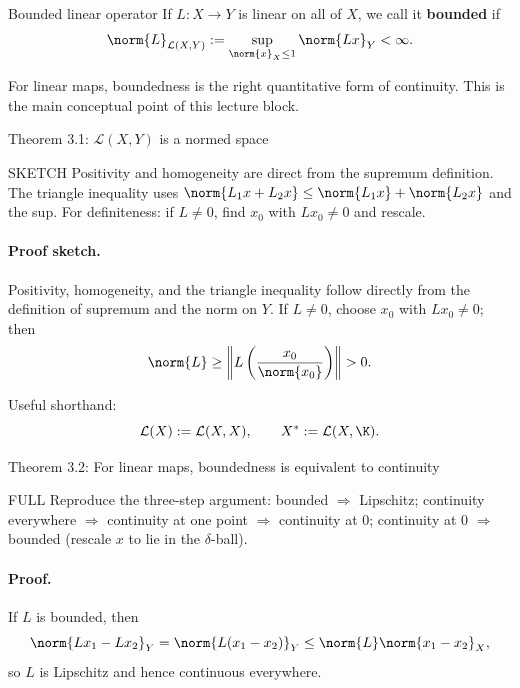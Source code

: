 \documentclass[header={Lecture 2 Exam Study Notes}]{study-note}
\begin{document}
\begin{defbox}{Bounded linear operator}
If $L:X\to Y$ is linear on all of $X$, we call it \textbf{bounded} if
\[
\norm{L}_{\mathcal L(X,Y)}:=\sup_{\norm{x}_X\le 1}\norm{Lx}_Y<\infty.
\]
\end{defbox}

\begin{focusbox}
For linear maps, boundedness is the right quantitative form of continuity. This is the main conceptual point of this lecture block.
\end{focusbox}

\begin{thmbox}{Theorem 3.1: $\mathcal L(X,Y)$ is a normed space}
\thmOperatorNorm
\end{thmbox}

\begin{prooflevelbox}{SKETCH}
Positivity and homogeneity are direct from the supremum definition. The triangle inequality uses $\norm{L_1x+L_2x}\le\norm{L_1x}+\norm{L_2x}$ and the sup. For definiteness: if $L\neq 0$, find $x_0$ with $Lx_0\neq 0$ and rescale.
\end{prooflevelbox}

\paragraph{Proof sketch.}
Positivity, homogeneity, and the triangle inequality follow directly from the definition of supremum and the norm on $Y$. If $L\neq 0$, choose $x_0$ with $Lx_0\neq 0$; then
\[
\norm{L}\ge \left\|L\left(\frac{x_0}{\norm{x_0}}\right)\right\|>0.
\]

\begin{focusbox}
Useful shorthand:
\[
\mathcal L(X):=\mathcal L(X,X),
\qquad
X^*:=\mathcal L(X,\K).
\]
\end{focusbox}

\begin{thmbox}{Theorem 3.2: For linear maps, boundedness is equivalent to continuity}
\thmBoundedIffContinuous
\end{thmbox}

\begin{prooflevelbox}{FULL}
Reproduce the three-step argument: bounded $\Rightarrow$ Lipschitz; continuity everywhere $\Rightarrow$ continuity at one point $\Rightarrow$ continuity at $0$; continuity at $0$ $\Rightarrow$ bounded (rescale $x$ to lie in the $\delta$-ball).
\end{prooflevelbox}

\paragraph{Proof.}
If $L$ is bounded, then
\[
\norm{Lx_1-Lx_2}_Y=\norm{L(x_1-x_2)}_Y\le \norm{L}\norm{x_1-x_2}_X,
\]
so $L$ is Lipschitz and hence continuous everywhere.
\end{document}
